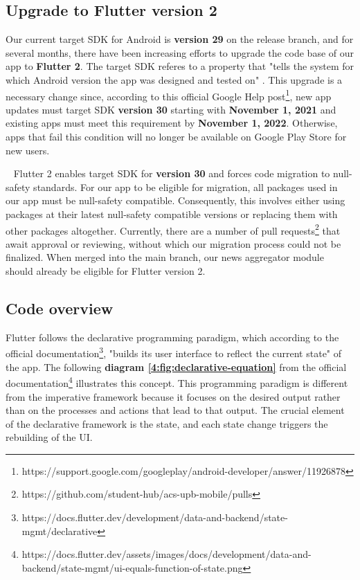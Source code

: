 \subsection{Upgrade to Flutter version 2}

Our current target SDK for Android is \textbf{version 29} on the release branch, and for several months, there have been increasing efforts to upgrade the code base of our app to \textbf{Flutter 2}. The target SDK referes to a property that "tells the system for which Android version the app was designed and tested on" \cite{targetsdk-meaning}. This upgrade is a necessary change since, according to this official Google Help post\footnote{https://support.google.com/googleplay/android-developer/answer/11926878}, new app updates must target SDK \textbf{version 30} starting with \textbf{November 1, 2021} and existing apps must meet this requirement by \textbf{November 1, 2022}. Otherwise, apps that fail this condition will no longer be available on Google Play Store for new users. 

~
Flutter 2 enables target SDK for \textbf{version 30} and forces code migration to null-safety standards. For our app to be eligible for migration, all packages used in our app must be null-safety compatible. Consequently, this involves either using packages at their latest null-safety compatible versions or replacing them with other packages altogether. Currently, there are a number of pull requests\footnote{https://github.com/student-hub/acs-upb-mobile/pulls} that await approval or reviewing, without which our migration process could not be finalized. When merged into the main branch, our news aggregator module should already be eligible for Flutter version 2.

\subsection{Code overview}

Flutter follows the declarative programming paradigm, which according to the official documentation\footnote{https://docs.flutter.dev/development/data-and-backend/state-mgmt/declarative}, "builds its user interface to reflect the current state" of the app. The following \textbf{diagram \ref{4:fig:declarative-equation}} from the official documentation\footnote{https://docs.flutter.dev/assets/images/docs/development/data-and-backend/state-mgmt/ui-equals-function-of-state.png} illustrates this concept. This programming paradigm is different from the imperative framework because it focuses on the desired output rather than on the processes and actions that lead to that output. The crucial element of the declarative framework is the state, and each state change triggers the rebuilding of the UI.

